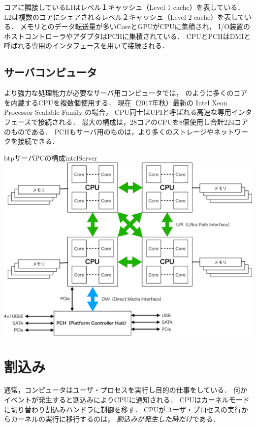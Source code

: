 コアに隣接しているL1はレベル１キャッシュ（Level 1 cache）を表している．
L2は複数のコアにシェアされるレベル２キャッシュ（Level 2 cache）を表している．
メモリとのデータ転送量が多いCoreとGPUがCPUに集積され，
I/O装置のホストコントローラやアダプタはPCHに集積されている．
CPUとPCHはDMIと呼ばれる専用のインタフェースを用いて接続される．

\subsection{サーバコンピュータ}
より強力な処理能力が必要なサーバ用コンピュータでは，
のように多くのコアを内蔵するCPUを複数個使用する．
現在（2017年秋）最新の Intel Xeon Processor Scalable Family の場合，
CPU同士はUPIと呼ばれる高速な専用インタフェースで接続される．
最大の構成は，28コアのCPUを8個使用し合計224コアのものである．
PCHもサーバ用のものは，より多くのストレージやネットワークを接続できる．

\begin{myfig}{btp}{サーバPCの構成}{intelServer}
  \includegraphics[scale=0.6]{Fig/intelServer-crop.pdf}
\end{myfig}

\section{割込み}
\label{interruptSource}
通常，コンピュータはユーザ・プロセスを実行し目的の仕事をしている．
何かイベントが発生すると割込みによりCPUに通知される．
CPUはカーネルモードに切り替わり割込みハンドラに制御を移す．
CPUがユーザ・プロセスの実行からカーネルの実行に移行するのは，
\emph{割込みが発生した時だけ}である．

